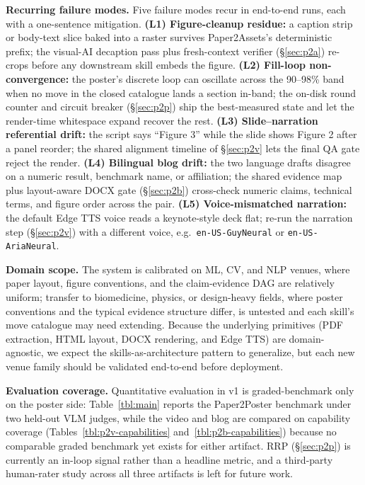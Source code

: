\documentclass{article}
\begin{document}
\textbf{Recurring failure modes.} Five failure modes recur in end-to-end runs, each with a one-sentence mitigation. \textbf{(L1) Figure-cleanup residue:} a caption strip or body-text slice baked into a raster survives Paper2Assets's deterministic prefix; the visual-AI decaption pass plus fresh-context verifier (\S\ref{sec:p2a}) re-crops before any downstream skill embeds the figure. \textbf{(L2) Fill-loop non-convergence:} the poster's discrete loop can oscillate across the 90--98\% band when no move in the closed catalogue lands a section in-band; the on-disk round counter and circuit breaker (\S\ref{sec:p2p}) ship the best-measured state and let the render-time whitespace expand recover the rest. \textbf{(L3) Slide--narration referential drift:} the script says ``Figure 3'' while the slide shows Figure 2 after a panel reorder; the shared alignment timeline of \S\ref{sec:p2v} lets the final QA gate reject the render. \textbf{(L4) Bilingual blog drift:} the two language drafts disagree on a numeric result, benchmark name, or affiliation; the shared evidence map plus layout-aware DOCX gate (\S\ref{sec:p2b}) cross-check numeric claims, technical terms, and figure order across the pair. \textbf{(L5) Voice-mismatched narration:} the default Edge TTS \citep{edgetts} voice reads a keynote-style deck flat; re-run the narration step (\S\ref{sec:p2v}) with a different voice, e.g.\ \texttt{en-US-GuyNeural} or \texttt{en-US-AriaNeural}.

\textbf{Domain scope.} The system is calibrated on ML, CV, and NLP venues, where paper layout, figure conventions, and the claim-evidence DAG are relatively uniform; transfer to biomedicine, physics, or design-heavy fields, where poster conventions and the typical evidence structure differ, is untested and each skill's move catalogue may need extending. Because the underlying primitives (PDF extraction, HTML layout, DOCX rendering, and Edge TTS) are domain-agnostic, we expect the skills-as-architecture pattern to generalize, but each new venue family should be validated end-to-end before deployment.

\textbf{Evaluation coverage.} Quantitative evaluation in v1 is graded-benchmark only on the poster side: Table~\ref{tbl:main} reports the Paper2Poster benchmark under two held-out VLM judges, while the video and blog are compared on capability coverage (Tables~\ref{tbl:p2v-capabilities} and~\ref{tbl:p2b-capabilities}) because no comparable graded benchmark yet exists for either artifact. RRP (\S\ref{sec:p2p}) is currently an in-loop signal rather than a headline metric, and a third-party human-rater study across all three artifacts is left for future work.
\end{document}
